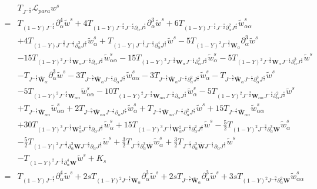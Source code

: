 \documentclass[10pt]{amsart}
\theoremstyle{remark}
\theoremstyle{definition}
\numberwithin{equation}{section}
\newcommand{\p}{\partial}
\newcommand{\al}{\alpha}
\newcommand{\f}{\frac}
\newcommand{\bw}{\mathbf{W}}
\begin{document}
\begin{align*}
&T_{J^{-\f{s}{2}}}\mathcal{L}_{para}w^s\\
=&T_{(1-Y)J^{-\f32}}\p_{\al}^4\tilde{w}^s+4T_{(1-Y)J^{-\f32}J^{-\f{s}{2}}\p_{\al}J^{\f{s}{2}}}\p^3_{\al}\tilde{w}^s+6T_{(1-Y)J^{-\f32}J^{-\f{s}{2}}\p^2_{\al}J^{\f{s}{2}}}\tilde{w}^s_{\al\al}\\
&+4T_{(1-Y)J^{-\f32}J^{-\f{s}{2}}\p^3_{\al}J^{\f{s}{2}}}\tilde{w}^s_{\al}+T_{(1-Y)J^{-\f32}J^{-\f{s}{2}}\p^4_{\al}J^{\f{s}{2}}}\tilde{w}^s-5T_{(1-Y)^2J^{-\f32}\mathbf{W}_{\al}}\p^3_{\al}\tilde{w}^s\\
&-15T_{(1-Y)^2J^{-\f32}\mathbf{W}_{\al}J^{-\f{s}{2}}\p_{\al}J^{\f{s}{2}}}\tilde{w}^s_{\al\al}-15T_{(1-Y)^2J^{-\f32}\mathbf{W}_{\al}J^{-\f{s}{2}}\p^2_{\al}J^{\f{s}{2}}}\tilde{w}^s_{\al}-5T_{(1-Y)^2J^{-\f32}\mathbf{W}_{\al}J^{-\f{s}{2}}\p^3_{\al}J^{\f{s}{2}}}\tilde{w}^s\\
&-T_{J^{-\f52}\bar{\bw}_{\al}}\p^3_{\al}\tilde{w}^s-3T_{J^{-\f52}\bar{\bw}_{\al}J^{-\f{s}{2}}\p_{\al}J^{\f{s}{2}}}\tilde{w}^s_{\al\al}-3T_{J^{-\f52}\bar{\bw}_{\al}J^{-\f{s}{2}}\p^2_{\al}J^{\f{s}{2}}}\tilde{w}^s_{\al}-T_{J^{-\f52}\bar{\bw}_{\al}J^{-\f{s}{2}}\p^3_{\al}J^{\f{s}{2}}}\tilde{w}^s\\
&-5T_{(1-Y)^2J^{-\f32}\mathbf{W}_{\al\al}}\tilde{w}^s_{\al\al}-10T_{(1-Y)^2J^{-\f32}\mathbf{W}_{\al\al}J^{-\f{s}{2}}\p_{\al}J^{\f{s}{2}}}\tilde{w}^s_{\al}-5T_{(1-Y)^2J^{-\f32}\mathbf{W}_{\al\al}J^{-\f{s}{2}}\p^2_{\al}J^{\f{s}{2}}}\tilde{w}^s
\\
&+T_{J^{-\f52}\bar{\mathbf{W}}_{\al\al}}\tilde{w}^s_{\al\al}+2T_{J^{-\f52}\bar{\mathbf{W}}_{\al\al}J^{-\f{s}{2}}\p_{\al}J^{\f{s}{2}}}\tilde{w}^s_{\al}+T_{J^{-\f52}\bar{\mathbf{W}}_{\al\al}J^{-\f{s}{2}}\p^2_{\al}J^{\f{s}{2}}}\tilde{w}^s +15T_{J^{-\f52}\bar{\mathbf{W}}_{\al\al}}\tilde{w}^s_{\al\al} \\
&+30T_{(1-Y)^3J^{-\f32}\mathbf{W}^2_{\al}J^{-\f{s}{2}}\p_{\al}J^{\f{s}{2}}}\tilde{w}^s_{\al}+15T_{(1-Y)^3J^{-\f32}\mathbf{W}^2_{\al}J^{-\f{s}{2}}\p^2_{\al}J^{\f{s}{2}}}\tilde{w}^s-\f52T_{(1-Y)^2J^{-\f32}\p^3_{\al}\mathbf{W}}\tilde{w}^s_{\al}\\
&-\f52T_{(1-Y)^2J^{-\f32}\p^3_{\al}\mathbf{W}J^{-\f{s}{2}}\p_{\al}J^{\f{s}{2}}}\tilde{w}^s+\f32T_{J^{-\f52}\p^3_{\al}\bar{\mathbf{W}}}\tilde{w}^s_{\al}+\f32T_{J^{-\f52}\p^3_{\al}\bar{\mathbf{W}}J^{-\f{s}{2}}\p_{\al}J^{\f{s}{2}}}\tilde{w}^s\\
&-T_{(1-Y)^2J^{-\f32}\p^4_{\al}\mathbf{W}}\tilde{w}^s+K_s\\
=&T_{(1-Y)J^{-\f32}}\p_{\al}^4\tilde{w}^s+2s T_{(1-Y)^2J^{-\f32}\bw_{\al}}\p^3_{\al}\tilde{w}^s+2s T_{J^{-\f52}\bar{\bw}_{\al}}\p^3_{\al}\tilde{w}^s+3s T_{(1-Y)^2J^{-\f32}\p^2_{\al}\bw}\tilde{w}^s_{\al\al}\\

\end{align*}
\end{document}
